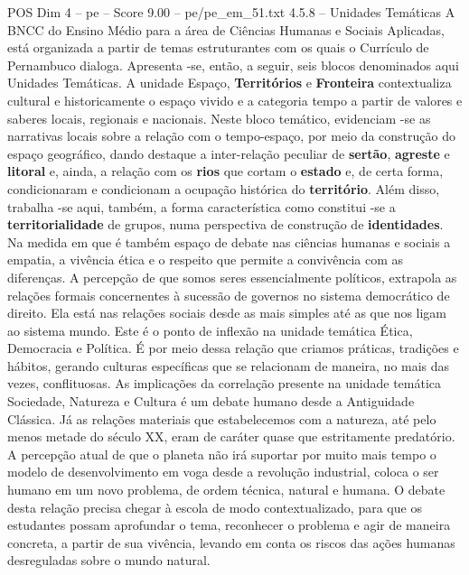 \begin{textsample}{POS Dim 4 – pe – Score 9.00 – pe/pe\_em\_51.txt}  \label{ex:f4_pos_275}
4.5.8 – Unidades Temáticas A BNCC do Ensino Médio para a área de Ciências Humanas e Sociais Aplicadas, está organizada a partir de temas estruturantes com os quais o Currículo de Pernambuco dialoga.
Apresenta -se, então, a seguir, seis blocos denominados aqui Unidades Temáticas.
A unidade Espaço, \textbf{Territórios} e \textbf{Fronteira} contextualiza cultural e historicamente o espaço vivido e a categoria tempo a partir de valores e saberes locais, regionais e nacionais.
Neste bloco temático, evidenciam -se as narrativas locais sobre a relação com o tempo-espaço, por meio da construção do espaço geográfico, dando destaque a inter-relação peculiar de \textbf{sertão}, \textbf{agreste} e \textbf{litoral} e, ainda, a relação com os \textbf{rios} que cortam o \textbf{estado} e, de certa forma, condicionaram e condicionam a ocupação histórica do \textbf{território}.
Além disso, trabalha -se aqui, também, a forma característica como constitui -se a \textbf{territorialidade} de grupos, numa perspectiva de construção de \textbf{identidades}.
Na medida em que é também espaço de debate nas ciências humanas e sociais a empatia, a vivência ética e o respeito que permite a convivência com as diferenças.
A percepção de que somos seres essencialmente políticos, extrapola as relações formais concernentes à sucessão de governos no sistema democrático de direito.
Ela está nas relações sociais desde as mais simples até as que nos ligam ao sistema mundo.
Este é o ponto de inflexão na unidade temática Ética, Democracia e Política.
É por meio dessa relação que criamos práticas, tradições e hábitos, gerando culturas específicas que se relacionam de maneira, no mais das vezes, conflituosas.
As implicações da correlação presente na unidade temática Sociedade, Natureza e Cultura é um debate humano desde a Antiguidade Clássica.
Já as relações materiais que estabelecemos com a natureza, até pelo menos metade do século XX, eram de caráter quase que estritamente predatório.
A percepção atual de que o planeta não irá suportar por muito mais tempo o modelo de desenvolvimento em voga desde a revolução industrial, coloca o ser humano em um novo problema, de ordem técnica, natural e humana.
O debate desta relação precisa chegar à escola de modo contextualizado, para que os estudantes possam aprofundar o tema, reconhecer o problema e agir de maneira concreta, a partir de sua vivência, levando em conta os riscos das ações humanas desreguladas sobre o mundo natural.

\end{textsample}
